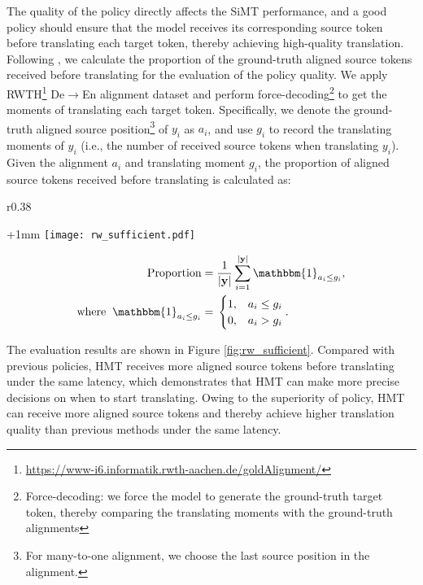 \documentclass{article} %
\begin{document}
The quality of the policy directly affects the SiMT performance, and a good policy should ensure that the model receives its corresponding source token before translating each target token, thereby achieving high-quality translation. Following \citet{dualpath}, we calculate the proportion of the ground-truth aligned source tokens received before translating for the evaluation of the policy quality. We apply RWTH\footnote{\url{https://www-i6.informatik.rwth-aachen.de/goldAlignment/}} De$\rightarrow$En alignment dataset and perform force-decoding\footnote{Force-decoding: we force the model to generate the ground-truth target token, thereby comparing the translating moments with the ground-truth alignments} to get the moments of translating each target token. Specifically, we denote the ground-truth aligned source position\footnote{For many-to-one alignment, we choose the last source position in the alignment.} of $y_{i}$ as $a_{i}$, and use $g_{i}$ to record the translating moments of $y_{i}$ (i.e., the number of received source tokens when translating $y_{i}$). Given the alignment $a_{i}$ and translating moment $g_{i}$, the proportion of aligned source tokens received before translating is calculated as:
\setlength{\columnsep}{15pt}
\begin{wrapfigure}{r}{0.38\textwidth}
\begin{center}
\advance\leftskip+1mm
\vspace{-0.1in}
 \texttt{[image: rw\_sufficient.pdf]}
 \vspace{-0.03in} 
  \caption{Quality of the policy in HMT. We calculate the proportion of aligned source tokens received before translating in various policies.}\label{fig:rw_sufficient}
   \vspace{-1in} 
\end{center}
\end{wrapfigure}
\begin{align}
    \text{Proportion}=&\; \frac{1}{\left | \mathbf{y} \right | }\sum_{i=1}^{\left | \mathbf{y} \right | }\mathbbm{1}_{a_{i}\leq g_{i}},\\
    \text{where}\;\;     \mathbbm{1}_{a_{i}\leq g_{i}}=&\; \begin{cases}
1, &  a_{i}\leq g_{i} \\
0, &  a_{i}> g_{i}
\end{cases}.
\end{align}



The evaluation results are shown in Figure \ref{fig:rw_sufficient}. Compared with previous policies, HMT receives more aligned source tokens before translating under the same latency, which demonstrates that HMT can make more precise decisions on when to start translating. Owing to the superiority of policy, HMT can receive more aligned source tokens and thereby achieve higher translation quality than previous methods under the same latency. 
\end{document}

